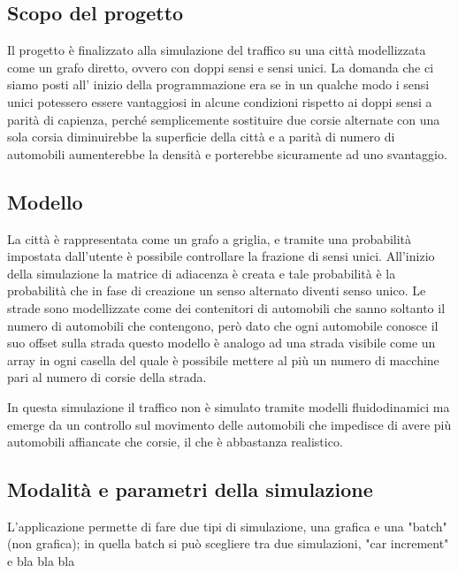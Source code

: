 \documentclass[main.tex]{subfiles}
\begin{document}
\subsection{Scopo del progetto}

Il progetto è finalizzato alla simulazione del traffico su una città modellizzata come un grafo diretto, ovvero con doppi sensi e sensi unici.
La domanda che ci siamo posti all' inizio della programmazione era se in un qualche modo i sensi unici potessero essere vantaggiosi in alcune condizioni
rispetto ai doppi sensi a parità di capienza, perché semplicemente sostituire due corsie alternate con una sola corsia diminuirebbe la superficie della città
e a parità di numero di automobili aumenterebbe la densità e porterebbe sicuramente ad uno svantaggio.

\subsection{Modello}

La città è rappresentata come un grafo a griglia, e tramite una probabilità impostata dall'utente è possibile controllare la frazione di sensi unici.
All'inizio della simulazione la matrice di adiacenza è creata e tale probabilità è la probabilità che in fase di creazione un senso alternato diventi senso unico.
Le strade sono modellizzate come dei contenitori di automobili che sanno soltanto il numero di automobili che contengono, però dato che ogni automobile conosce il suo offset sulla strada
questo modello è analogo ad una strada visibile come un array in ogni casella del quale è possibile mettere al più un numero di macchine pari al numero di corsie della strada.

In questa simulazione il traffico non è simulato tramite modelli fluidodinamici ma emerge da un controllo sul movimento delle automobili che impedisce
di avere più automobili affiancate che corsie, il che è abbastanza realistico.

\subsection{Modalità e parametri della simulazione }

L'applicazione permette di fare due tipi di simulazione, una grafica e una "batch" (non grafica); in quella batch si può scegliere tra due simulazioni, "car increment" e bla bla bla

\end{document}
